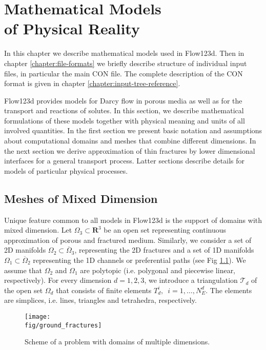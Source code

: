 \documentclass[12pt,a4paper]{report}
\def\Real{{\mathbf R}}
\def\fig{figures}
\begin{document}







\chapter[Mathematical Models of Physical Reality]{Mathematical Models \\of Physical Reality}
\label{chapter:mathematical_models}

In this chapter we describe mathematical models used in Flow123d.
Then in chapter \ref{chapter:file-formats} we briefly describe structure of individual input files, in particular the main CON file.
The complete description of the CON format is given in chapter \ref{chapter:input-tree-reference}.

Flow123d provides models for Darcy flow in porous media as well as for the transport and reactions of solutes. In this section, we describe 
mathematical formulations of these models together with physical meaning and units of all involved quantities. In the first section we present 
basic notation and assumptions about computational domains and meshes that combine different dimensions. In the next section we
derive approximation of thin fractures by lower dimensional interfaces for a general transport process. Latter sections describe details for models of particular
physical processes.

\section{Meshes of Mixed Dimension}
Unique feature common to all models in Flow123d is the support of
domains with mixed dimension. 
Let $\Omega_{3} \subset \Real^3$ be an open set representing continuous approximation of porous and fractured medium.
Similarly, we consider a set of 2D manifolds $\Omega_2\subset\overline\Omega_3$, representing the 2D fractures and a set of 1D manifolds $\Omega_1\subset \overline\Omega_2$ 
representing the 1D channels or preferential paths (see Fig \ref{fig:multi-dim}).
We assume that $\Omega_2$ and $\Omega_1$ are polytopic (i.e. polygonal and piecewise linear, respectively).
For every dimension $d=1,2,3$, we introduce a triangulation $\mathcal{T}_{d}$ of the open set $\Omega_d$
that consists of finite elements $T_{d}^{i},$\ $i = 1,\dots,N_{E}^{d}$.
The elements are simplices, i.e. lines, triangles and tetrahedra, respectively.

\begin{figure}[h]
\centering
\texttt{[image: \\fig/ground\_fractures]}
\caption{
    \label{fig:multi-dim}
    Scheme of a problem with domains of multiple dimensions.
}
\end{figure}
\end{document}
